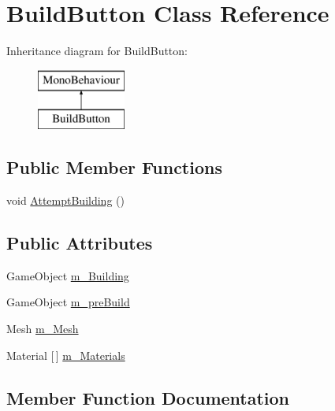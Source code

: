 \hypertarget{class_build_button}{}\section{Build\+Button Class Reference}
\label{class_build_button}
Inheritance diagram for Build\+Button\+:\begin{figure}[H]
\begin{center}
\leavevmode
\includegraphics[height=2.000000cm]{class_build_button}
\end{center}
\end{figure}
\subsection*{Public Member Functions}
\begin{DoxyCompactItemize}
\item 
void \mbox{\hyperlink{class_build_button_a95355307f508f7c253afbacd22abeed1}{Attempt\+Building}} ()
\end{DoxyCompactItemize}
\subsection*{Public Attributes}
\begin{DoxyCompactItemize}
\item 
Game\+Object \mbox{\hyperlink{class_build_button_ab7ee826efb23fe6e66ac98c0d4e07e12}{m\+\_\+\+Building}}
\item 
Game\+Object \mbox{\hyperlink{class_build_button_a3802b3eb4f96ee6ca2448fd19836b54f}{m\+\_\+pre\+Build}}
\item 
Mesh \mbox{\hyperlink{class_build_button_a66e13973bce8de973b80c0680634f3c4}{m\+\_\+\+Mesh}}
\item 
Material \mbox{[}$\,$\mbox{]} \mbox{\hyperlink{class_build_button_ab1cbb6a2f867e5a9c6cb372e754e72f3}{m\+\_\+\+Materials}}
\end{DoxyCompactItemize}


\subsection{Member Function Documentation}
\mbox{\label{class_build_button_a95355307f508f7c253afbacd22abeed1}} 
